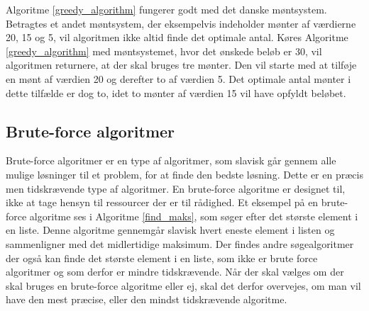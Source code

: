 Algoritme \ref{greedy_algorithm} fungerer godt med det danske møntsystem. 
Betragtes et andet møntsystem, der eksempelvis indeholder mønter af værdierne 20, 15 og 5, vil algoritmen ikke altid finde det optimale antal. 
Køres Algoritme \ref{greedy_algorithm} med møntsystemet, hvor det ønskede beløb er 30, vil algoritmen returnere, at der skal bruges tre mønter. 
Den vil starte med at tilføje en mønt af værdien 20 og derefter to af værdien 5.
Det optimale antal mønter i dette tilfælde er dog to, idet to mønter af værdien 15 vil have opfyldt beløbet.


\subsection{Brute-force algoritmer}
Brute-force algoritmer er en type af algoritmer, som slavisk går gennem alle mulige løsninger til et problem, for at finde den bedste løsning.
Dette er en præcis men tidskrævende type af algoritmer. 
En brute-force algoritme er designet til, ikke at tage hensyn til ressourcer der er til rådighed.
Et eksempel på en brute-force algoritme ses i Algoritme \ref{find_maks}, som søger efter det største element i en liste. 
Denne algoritme gennemgår slavisk hvert eneste element i listen og sammenligner med det midlertidige maksimum.
Der findes andre søgealgoritmer der også kan finde det største element i en liste, som ikke er brute force algoritmer og som derfor er mindre tidskrævende. 
Når der skal vælges om der skal bruges en brute-force algoritme eller ej, skal det derfor overvejes, om man vil have den mest præcise, eller den mindst tidskrævende algoritme. 